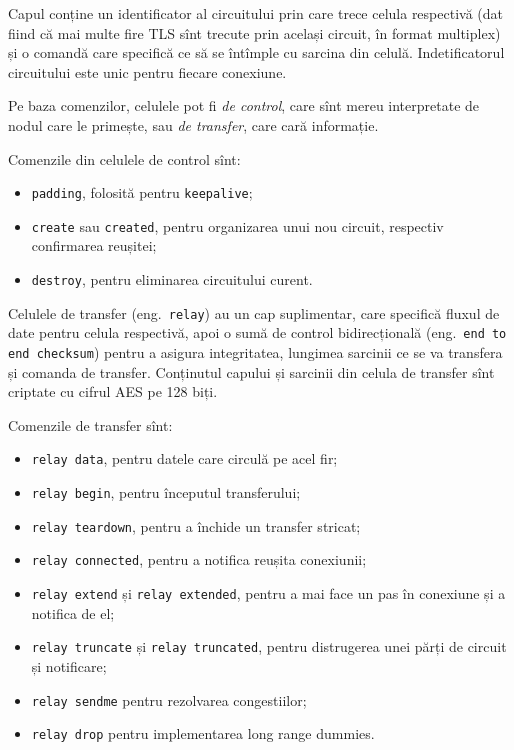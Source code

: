 Capul conține un identificator al circuitului prin care trece celula respectivă
(dat fiind că mai multe fire TLS sînt trecute prin același circuit, în format
multiplex) și o comandă care specifică ce să se întîmple cu sarcina
din celulă. Indetificatorul circuitului este unic pentru fiecare conexiune.

Pe baza comenzilor, celulele pot fi \emph{de control}, care sînt mereu
interpretate de nodul care le primește, sau \emph{de transfer}, care
cară informație.  

Comenzile din celulele de control sînt:
\begin{itemize}
  \item \texttt{padding}, folosită pentru \texttt{keepalive};
  \item \texttt{create} sau \texttt{created}, pentru organizarea unui
    nou circuit, respectiv confirmarea reușitei;
  \item \texttt{destroy}, pentru eliminarea circuitului curent.
\end{itemize}

Celulele de transfer (eng.\ \texttt{relay}) au un cap suplimentar, care
specifică fluxul de date pentru celula respectivă, apoi o sumă de
control bidirecțională (eng.\ \texttt{end to end checksum}) pentru a
asigura integritatea, lungimea sarcinii ce se va transfera și comanda
de transfer. Conținutul capului și sarcinii din celula de transfer
sînt criptate cu cifrul AES pe 128 biți.

Comenzile de transfer sînt:
\begin{itemize}
  \item \texttt{relay data}, pentru datele care circulă pe acel fir;
  \item \texttt{relay begin}, pentru începutul transferului;
  \item \texttt{relay teardown}, pentru a închide un transfer stricat;
  \item \texttt{relay connected}, pentru a notifica reușita conexiunii;
  \item \texttt{relay extend} și \texttt{relay extended}, pentru a mai
    face un pas în conexiune și a notifica de el;
  \item \texttt{relay truncate} și \texttt{relay truncated}, pentru distrugerea
    unei părți de circuit și notificare;
  \item \texttt{relay sendme} pentru rezolvarea congestiilor;
  \item \texttt{relay drop} pentru implementarea {\color{red} long range dummies}.
\end{itemize}

